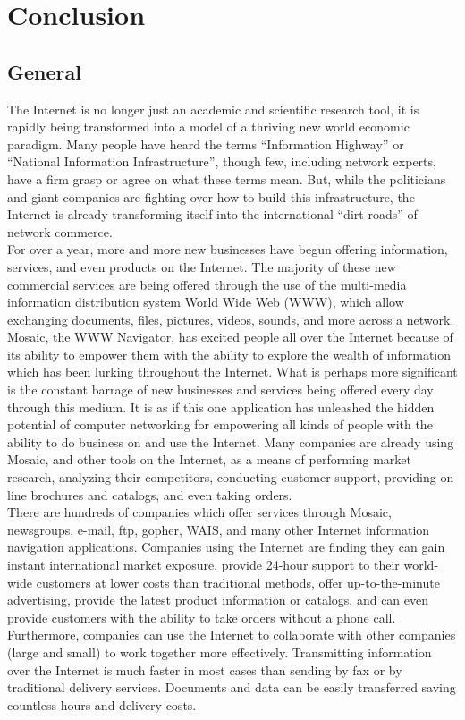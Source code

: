 \chapter{Conclusion}

\section{General}

The Internet is no longer just an academic and scientific research
tool, it is rapidly being transformed into a model of a thriving new
world economic paradigm. Many people have heard the terms ``Information
Highway'' or ``National Information Infrastructure'', though few,
including network experts, have a firm grasp or agree on what these
terms mean. But, while the politicians and giant companies are fighting
over how to build this infrastructure, the Internet is already
transforming itself into the international ``dirt roads'' of network
commerce.\\

For over a year, more and more new businesses have begun offering
information, services, and even products on the Internet. The majority
of these new commercial services are being offered through the use of
the multi-media information distribution system World Wide Web (WWW),
which allow exchanging documents, files, pictures, videos, sounds, and
more across a network.\\

Mosaic, the WWW Navigator, has excited people all over the Internet
because of its ability to empower them with the ability to explore the
wealth of information which has been lurking throughout the Internet.
What is perhaps more significant is the constant barrage of new
businesses and services being offered every day through this medium. It
is as if this one application has unleashed the hidden potential of
computer networking for empowering all kinds of people with the ability
to do business on and use the Internet. Many companies are already
using Mosaic, and other tools on the Internet, as a means of performing
market research, analyzing their competitors, conducting customer
support, providing on-line brochures and catalogs, and even taking
orders.\\

There are hundreds of companies which offer services through Mosaic,
newsgroups, e-mail, ftp, gopher, WAIS, and many other Internet
information navigation applications. Companies using the Internet are
finding they can gain instant international market exposure, provide
24-hour support to their world-wide customers at lower costs than
traditional methods, offer up-to-the-minute advertising, provide the
latest product information or catalogs, and can even provide customers
with the ability to take orders without a phone call. Furthermore,
companies can use the Internet to collaborate with other companies
(large and small) to work together more effectively. Transmitting
information over the Internet is much faster in most cases than sending
by fax or by traditional delivery services. Documents and data can be
easily transferred saving countless hours and delivery costs.\\

